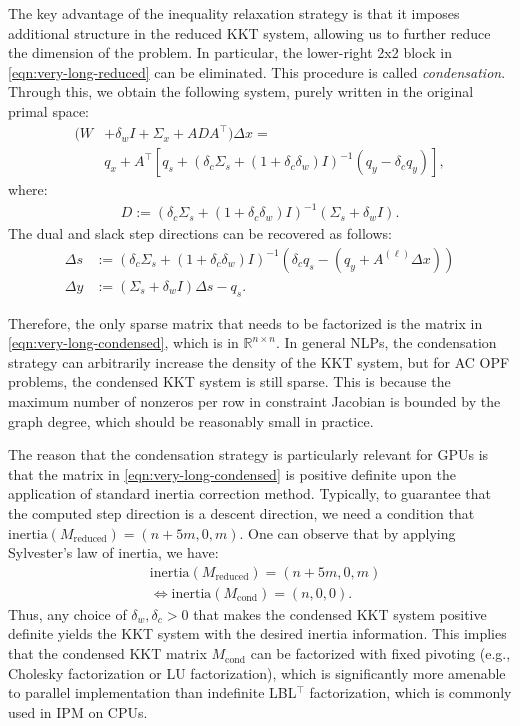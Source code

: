 The key advantage of the inequality relaxation strategy is that it
imposes additional structure in the reduced KKT system, allowing us to
further reduce the dimension of the problem. In particular, the
lower-right 2x2 block in \eqref{eqn:very-long-reduced} can be
eliminated. This procedure is called {\it condensation}. Through this,
we obtain the following system, purely written in the original primal
space:
\begin{align}\label{eqn:very-long-condensed}
  (W &+ \delta_wI + \Sigma_x + A D A^{\top} ) \Delta x  =\\\nonumber
     &  q_x + A^\top \left[q_s + \left(\delta_c \Sigma_s + (1+\delta_c\delta_w) I\right)^{-1} (q_y -\delta_c q_y )\right],
\end{align}
where:
\begin{align*}
  D := \left(\delta_c \Sigma_s + (1+\delta^{}_c\delta^{}_w) I\right)^{-1} \left(\Sigma_s + \delta^{}_w I\right).
\end{align*}
The dual and slack step directions can be recovered as follows:
\begin{align}
  \Delta s &:= \left(\delta_c \Sigma_s + (1+\delta^{}_c\delta^{}_w) I\right)^{-1} \left(\delta_c q_s - (q_y + A^{(\ell)}\Delta x)\right)\nonumber\\
  \Delta y &:= (\Sigma_s + \delta_w I) \Delta s -q_s.\label{eqn:recover-2}
\end{align}

Therefore, the only sparse matrix that needs to be factorized is the
matrix in \eqref{eqn:very-long-condensed}, which is in
$\mathbb{R}^{n\times n}$. In general NLPs, the condensation strategy
can arbitrarily increase the density of the KKT system, but for AC OPF
problems, the condensed KKT system is still sparse.
This is because the maximum number of nonzeros per row in constraint
Jacobian is bounded by the graph degree, which should be reasonably
small in practice.

The reason that the condensation strategy is particularly relevant for
GPUs is that the matrix in \eqref{eqn:very-long-condensed} is positive
definite upon the application of standard inertia correction
method. Typically, to guarantee that the computed step direction is a
descent direction, we need a condition that
$\text{inertia}(M_\text{reduced}) = (n+5m,0,m)$. One can observe that
by applying Sylvester's law of inertia, we have:
\begin{align*}
  &\text{inertia}(M_\text{reduced}) = (n+5m,0,m)\\
  &\iff \text{inertia}(M_\text{cond}) = (n,0,0).
\end{align*}
Thus, any choice of $\delta_w,\delta_c>0$ that makes the condensed KKT
system positive definite yields the KKT system with the desired
inertia information. This implies that the condensed KKT matrix
$M_{\text{cond}}$ can be factorized with fixed pivoting (e.g.,
Cholesky factorization or LU factorization), which is significantly
more amenable to parallel implementation than indefinite LBL$^\top$
factorization, which is commonly used in IPM on CPUs.

